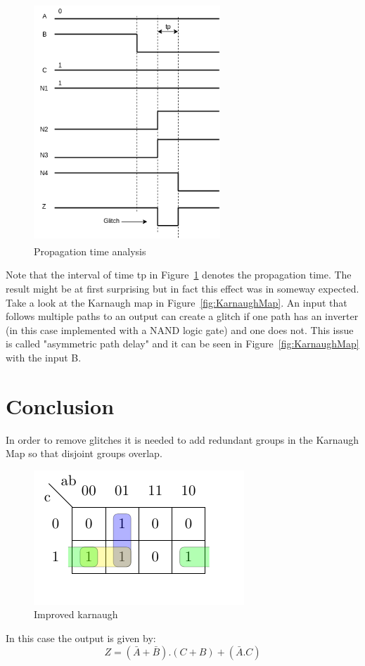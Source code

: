 \documentclass[a4paper,12pt]{article}
\begin{document}
\begin{figure}[H] 
    \begin{center}
    \includegraphics[width=7cm,height=9cm]{glitch.png}
    \end{center}
    \caption{Propagation time analysis}
    \label{fig:proptime}
    \end{figure} 
Note that the interval of time tp in Figure~\ref{fig:proptime}  denotes the propagation time.
\linebreak
The result might be at first surprising but  in fact this effect was in someway
expected. Take a look at the Karnaugh map in Figure~\ref{fig:KarnaughMap}.
An input that follows multiple paths to an output can create a glitch if 
one path has an inverter (in this case implemented with a NAND logic gate) 
and one does not. This issue is called "asymmetric path delay" and it can be
seen in Figure~\ref{fig:KarnaughMap} with the input B.

\section*{Conclusion}
In order to remove glitches it is needed to add redundant groups in the
Karnaugh Map so that disjoint groups overlap.
\begin{figure}[H] 
    \begin{center}
    \includegraphics{karnaugh_improved.pdf}
    \end{center}
    \caption{Improved karnaugh}
    \label{fig:karnaugh_improved}
    \end{figure} 
In this case the output is given by:
\begin{equation*}
    Z= (\bar{A}+\bar{B}).(C+B)+(\bar{A}.C)    
\end{equation*} 
\end{document}
